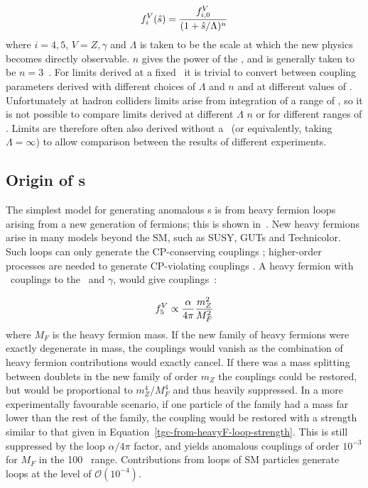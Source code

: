 \begin{align}
f_{i}^{V}(\hat{s}) = \frac{f^{V}_{i,0}}{(1 + \hat{s} / \Lambda)^{n}}
\end{align}
where $i=4,5$, $V=Z,\gamma$ and $\Lambda$ is taken to be the scale at which the
new physics becomes directly observable. $n$ gives the power of the \formfactor,
and is generally taken to be $n=3$~\cite{Baur:2000ae}. For limits derived at a
fixed \shat\ it is trivial to convert between coupling parameters derived with
different choices of $\Lambda$ and $n$ and at different values of \shat. 
Unfortunately at hadron colliders limits arise
from integration of a range of \shat, so it is not possible to compare
limits derived at different $\Lambda$ $n$ or for different ranges of \shat. 
Limits are therefore often also derived
without a \formfactor\ (or equivalently, taking $\Lambda = \infty$) to allow
comparison between the results of different experiments.

\subsection{Origin of \TGC s}


The simplest model for generating anomalous \TGC s is from heavy fermion
loops arising from a new generation of fermions; this is shown in~. New heavy fermions arise
in many models beyond the SM, such as SUSY, GUTs and Technicolor.
Such
loops can only generate the CP-conserving couplings \ffiveV; higher-order
processes are needed to generate CP-violating couplings \ffourV. A heavy fermion
with \sm\ couplings to the \Z\ and $\gamma$, would give couplings~\cite{Gounaris:2000tb}:

\begin{align}
\ffiveV \propto \frac{\alpha}{4\pi} \frac{m_{Z}^{2}}{M_{F}^{2}}
\label{tgc-from-heavyF-loop-strength}
\end{align}
where $M_{F}$ is the heavy fermion mass. If the new family of heavy fermions
were exactly degenerate in mass, the couplings would vanish as the combination of heavy
fermion contributions would exactly cancel. If there was a mass splitting between doublets in the new family of
order $m_{Z}$ the couplings could be restored, but would be proportional to $m_{Z}^{4} / M_{F}^{4}$ and thus heavily suppressed. In a more
experimentally favourable scenario, if one particle of the family had a mass far
lower than the rest of the family, the coupling would be restored with a
strength similar to that given in Equation~\ref{tgc-from-heavyF-loop-strength}.
This is still suppressed by the loop $\alpha / 4\pi$ factor, and yields
anomalous couplings of order $10^{-3}$ for $M_F$ in the 100 \gev\ range.
Contributions from loops
of SM particles generate loops at the level of $\mathcal{O}(10^{-4})$. 

